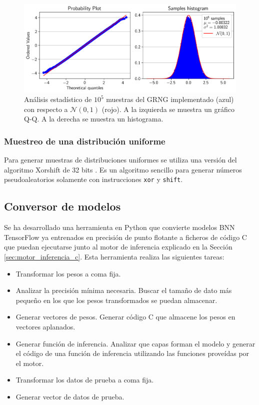 \begin{figure}[h]
    \centering
    \includegraphics[width=\textwidth]{root/Imagenes/4_bnn_riscv/gaus_aprox.png}
    \caption{Análisis estadístico de $10^5$ muestras del GRNG implementado (azul) con respecto a $\mathcal{N}(0,1)$ (rojo). A la izquierda se muestra un gráfico Q-Q. A la derecha se muestra un histograma.}
    \label{fig:gauss_aprox}
\end{figure}

\subsubsection{Muestreo de una distribución uniforme}

Para generar muestras de distribuciones uniformes se utiliza una versión del algoritmo Xorshift de 32 bits \cite{xorshift}. Es un algoritmo sencillo para generar números pseudoaleatorios solamente con instrucciones \texttt{xor} y \texttt{shift}.

\subsection{Conversor de modelos}

Se ha desarrollado una herramienta en Python que convierte modelos BNN TensorFlow ya entrenados en precisión de punto flotante a ficheros de código C que puedan ejecutarse junto al motor de inferencia explicado en la Sección \ref{sec:motor_inferencia_c}. Esta herramienta realiza las siguientes tareas:

\begin{itemize}
    \item Transformar los pesos a coma fija.
    \item Analizar la precisión mínima necesaria. Buscar el tamaño de dato más pequeño en los que los pesos transformados se puedan almacenar. \todo
    \item Generar vectores de pesos. Generar código C que almacene los pesos en vectores aplanados.
    \item Generar función de inferencia. Analizar que capas forman el modelo y generar el código de una función de inferencia utilizando las funciones proveídas por el motor.
    \item Transformar los datos de prueba a coma fija.
    \item Generar vector de datos de prueba.
\end{itemize}

